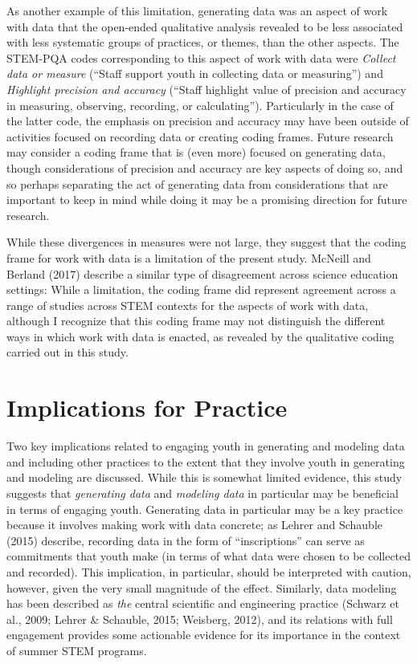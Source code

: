 \documentclass[]{msu-thesis}
\theoremstyle{definition}
\theoremstyle{definition}
\theoremstyle{definition}
\theoremstyle{remark}
\begin{document}
As another example of this limitation, generating data was an aspect of
work with data that the open-ended qualitative analysis revealed to be
less associated with less systematic groups of practices, or themes,
than the other aspects. The STEM-PQA codes corresponding to this aspect
of work with data were \emph{Collect data or measure} (``Staff support
youth in collecting data or measuring'') and \emph{Highlight precision
and accuracy} (``Staff highlight value of precision and accuracy in
measuring, observing, recording, or calculating''). Particularly in the
case of the latter code, the emphasis on precision and accuracy may have
been outside of activities focused on recording data or creating coding
frames. Future research may consider a coding frame that is (even more)
focused on generating data, though considerations of precision and
accuracy are key aspects of doing so, and so perhaps separating the act
of generating data from considerations that are important to keep in
mind while doing it may be a promising direction for future research.

While these divergences in measures were not large, they suggest that
the coding frame for work with data is a limitation of the present
study. McNeill and Berland (2017) describe a similar type of
disagreement across science education settings: While a limitation, the
coding frame did represent agreement across a range of studies across
STEM contexts for the aspects of work with data, although I recognize
that this coding frame may not distinguish the different ways in which
work with data is enacted, as revealed by the qualitative coding carried
out in this study.

\section{Implications for Practice}\label{implications-for-practice}

Two key implications related to engaging youth in generating and
modeling data and including other practices to the extent that they
involve youth in generating and modeling are discussed. While this is
somewhat limited evidence, this study suggests that \emph{generating
data} and \emph{modeling data} in particular may be beneficial in terms
of engaging youth. Generating data in particular may be a key practice
because it involves making work with data concrete; as Lehrer and
Schauble (2015) describe, recording data in the form of ``inscriptions''
can serve as commitments that youth make (in terms of what data were
chosen to be collected and recorded). This implication, in particular,
should be interpreted with caution, however, given the very small
magnitude of the effect. Similarly, data modeling has been described as
\emph{the} central scientific and engineering practice (Schwarz et al.,
2009; Lehrer \& Schauble, 2015; Weisberg, 2012), and its relations with
full engagement provides some actionable evidence for its importance in
the context of summer STEM programs.
\end{document}
